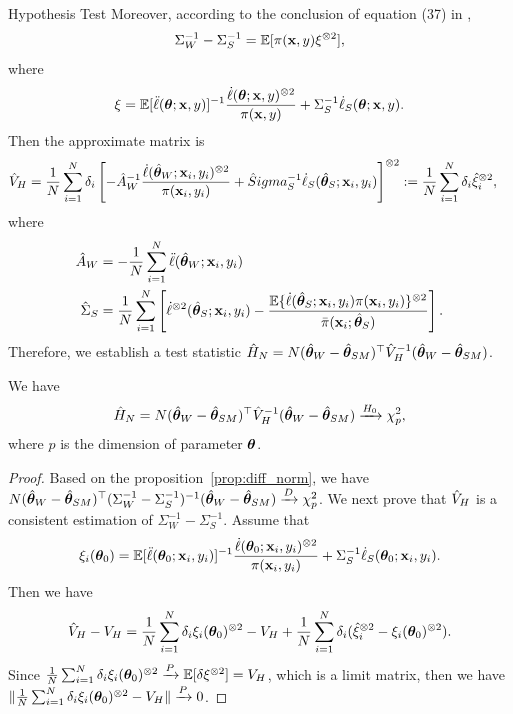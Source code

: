 \documentclass[12pt,hidelinks]{article}
\begin{document}
\begin{section}{Hypothesis Test}
Moreover, according to the conclusion of equation (37) in \citet{wang2022maximum}, 
\begin{align}
    \Sigma_W^{-1} - \Sigma_S^{-1} = \mathbb{E} [\pi(\mathbf{x}, y) \xi^{\otimes 2}],
\end{align}
where 
\begin{align}
    \xi= \mathbb{E}[\ddot \ell( \bm{\theta};\mathbf{x}, y)]^{-1} \frac{\dot \ell( \bm{\theta};\mathbf{x}, y)^{\otimes 2}}{\pi(\mathbf{x}, y)} + \Sigma_S^{-1} \dot \ell_S( \bm{\theta};\mathbf{x}, y).
\end{align}
Then the approximate matrix is 
\begin{align}
    \hat V_H &= \frac{1}{N} \sum_{i=1}^{N} \delta_i \left[-\hat A_W^{-1} \frac{\dot \ell( {\hat{\bm{\theta}}}_W;\mathbf{x}_i, y_i)^{\otimes 2}}{\pi(\mathbf{x}_i, y_i)} + \hat Sigma_S^{-1} \dot \ell_S( {\hat{\bm{\theta}}}_S;\mathbf{x}_i, y_i) \right]^{\otimes 2} := \frac{1}{N} \sum_{i=1}^{N} \delta_i \hat \xi_i^{\otimes 2},
\end{align}
where
\begin{align}
    \hat A_W &= -\frac{1}{N} \sum_{i=1}^{N} \ddot \ell({\hat{\bm{\theta}}}_W;\mathbf{x}_i, y_i) \\
     \hat \Sigma_S&= \frac{1}{N} \sum_{i=1}^{N} \left[\dot \ell^{\otimes 2}({\hat{\bm{\theta}}}_S; \mathbf{x}_i, y_i) - \frac{ \mathbb{E} \{\dot \ell ({\hat{\bm{\theta}}}_S; \mathbf{x}_i, y_i) \pi(\mathbf{x}_i, y_i)\}^{\otimes 2}}{\bar{\pi}(\mathbf{x}_i; {\hat{\bm{\theta}}}_S)} \right].
\end{align}
Therefore, we establish a test statistic $\hat{H}_N = N ({\hat{\bm{\theta}}}_W - {\hat{\bm{\theta}}}_{SM})^\top \hat V_H^{-1} ({\hat{\bm{\theta}}}_W - {\hat{\bm{\theta}}}_{SM})$.

\begin{proposition}
    We have 
    \begin{align}
        \hat H_N = N ({\hat{\bm{\theta}}}_W - {\hat{\bm{\theta}}}_{SM})^\top \hat V_H^{-1} ({\hat{\bm{\theta}}}_W - {\hat{\bm{\theta}}}_{SM}) \xrightarrow{H_0} \chi_p^2,
    \end{align}
    where $p$ is the dimension of parameter $\bm{\theta}$.
\end{proposition}

\begin{proof}
Based on the proposition~\ref{prop:diff_norm}, we have $N({\hat{\bm{\theta}}}_W-{\hat{\bm{\theta}}}_{SM})^\top (\Sigma_W^{-1} - \Sigma_{S}^{-1})^{-1} ({\hat{\bm{\theta}}}_W-{\hat{\bm{\theta}}}_{SM}) \xrightarrow{D} \chi_p^2$.
We next prove that $\hat{V}_H$ is a consistent estimation of $\Sigma_W^{-1} - \Sigma_{S}^{-1}$.
Assume that 
\begin{align}
    \xi_i(\bm{\theta}_0) = \mathbb{E}[\ddot \ell( \bm{\theta}_0;\mathbf{x}_i, y_i)]^{-1} \frac{\dot \ell( \bm{\theta}_0;\mathbf{x}_i, y_i)^{\otimes 2}}{\pi(\mathbf{x}_i, y_i)} + \Sigma_S^{-1} \dot \ell_S( \bm{\theta}_0;\mathbf{x}_i, y_i).
\end{align}
Then we have 
\begin{align*}
    \hat{V}_H - V_H = \frac{1}{N} \sum_{i=1}^{N} \delta_i \xi_i(\bm{\theta}_0)^{\otimes 2} - V_H + \frac{1}{N} \sum_{i=1}^{N}\delta_i (\hat \xi_i^{\otimes 2} - \xi_i(\bm{\theta}_0)^{\otimes 2}).
\end{align*}
Since $\frac{1}{N} \sum_{i=1}^{N} \delta_i \xi_i(\bm{\theta}_0)^{\otimes 2} \xrightarrow{P} \mathbb{E}[\delta \xi^{\otimes 2}] = V_H$, which is a limit matrix, then we have $\|\frac{1}{N} \sum_{i=1}^{N} \delta_i \xi_i(\bm{\theta}_0)^{\otimes 2} - V_H\| \xrightarrow{P} 0$.


\end{proof}
\end{section}
\end{document}
